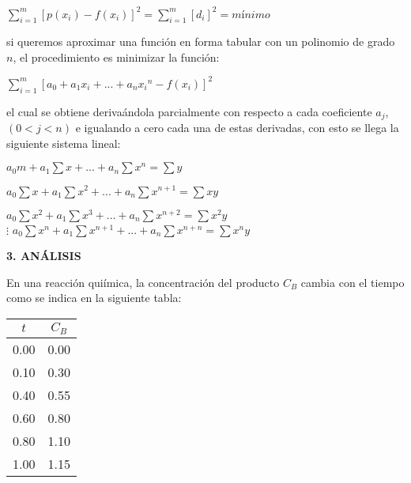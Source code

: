 \documentclass[10pt,a4paper]{article}
\begin{document}
\begin{multicols}{2}
\begin{center}
	$\displaystyle\sum_{i=1}^m {[p(x_i) - f(x_i)]}^2 = \displaystyle\sum_{i=1}^m {[d_i]}^2 = mínimo$
\end{center} 

si queremos aproximar una función en forma tabular con un polinomio de grado $n$, el procedimiento es minimizar la función:
\begin{center}
	$ \displaystyle\sum_{i=1}^m {[a_0 + a_1x_i + ... + a_n{x_i}^n - f(x_i)]}^2 $
\end{center}
el cual se obtiene derivaándola parcialmente con respecto a cada coeficiente $a_j$, $(0<j<n)$ e igualando a cero cada una de estas derivadas, con esto se llega la siguiente sistema lineal:

\begin{center}
	$a_0 m + a_1\displaystyle\sum x + ... + a_n \displaystyle\sum x^n = \displaystyle\sum y$
	
	$a_0 \displaystyle\sum x + a_1\displaystyle\sum x^2 + ... + a_n \displaystyle\sum x^{n+1} = \displaystyle\sum xy$
	
	$a_0 \displaystyle\sum x^2 + a_1\displaystyle\sum x^3 + ... + a_n \displaystyle\sum x^{n+2} = \displaystyle\sum x^2y$\\
	$\vdots$
	$a_0 \displaystyle\sum x^n + a_1\displaystyle\sum x^{n+1} + ... + a_n \displaystyle\sum x^{n+n} = \displaystyle\sum x^ny$
	


\end{center}

\vspace*{0.2cm}

\begin{center}
	{\large \bf 3. ANÁLISIS}
\end{center}

\vspace*{0.2cm}

\noindent En una reacción quiímica, la concentración del producto $C_B$ cambia con el tiempo como se indica en la siguiente tabla:


\begin{center}
	\begin{tabular}{ |c|c| }
		\hline
		$t$ & $C_B$ \\ \hline
		0.00 & 0.00 \\ \hline
		0.10 & 0.30 \\ \hline
		0.40 & 0.55 \\ \hline
		0.60 & 0.80 \\ \hline
		0.80 & 1.10 \\ \hline
		1.00 & 1.15 \\ \hline
	\end{tabular}
\end{center}


\end{multicols}
\end{document}
